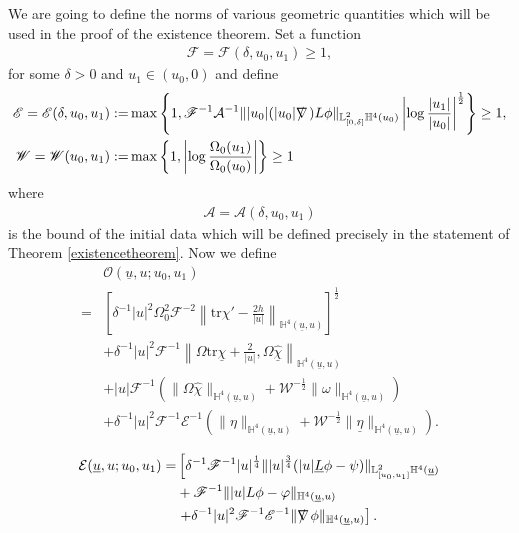 \documentclass[11pt,reqno]{amsart}
\theoremstyle{definition}
\numberwithin{equation}{section}
\newcommand{\tr}{\mathrm{tr}}
\renewcommand{\L}{\mathbb{L}}
\renewcommand{\H}{\mathbb{H}}
\def\chib{\underline{\chi}}
\def\chibh{\widehat{\underline{\chi}}}
\def\chih{\widehat{\chi}}
\def\etab{\underline{\eta}}
\def\Lb{\underline{L}}
\def\tr{\mathrm{tr}}
\def\ub{\underline{u}}
\newcommand{\logOmega}{\left|\log\frac{\Omega_0(u_1)}{\Omega_0(u_0)}\right|}
\def\nablas{\mbox{$\nabla \mkern -13mu /$ }}
\begin{document}
We are going to define the norms of various geometric quantities which will be used in the proof of the existence theorem. Set a function
\begin{align*}
\mathscr{F}=\mathscr{F}(\delta,u_0,u_1)\ge1,
\end{align*}
for some $\delta>0$ and $u_1\in(u_0,0)$ and define
\begin{align*}
\mathscr{E}=\mathscr{E}(\delta,u_0,u_1):=&\max\left\{1, \mathscr{F}^{-1}\mathcal{A}^{-1}\||u_0|(|u_0|\nablas)L\phi\|_{\L^2_{[0,\delta]}\H^4(u_0)}\left|\log\frac{|u_1|}{|u_0|}\right|^{\frac{1}{2}}\right\}\ge1,\\
\mathscr{W}=\mathscr{W}(u_0,u_1):=&\max\left\{1,\logOmega\right\}\ge1
\end{align*}
where
\begin{align*}
\mathcal{A}=\mathcal{A}(\delta,u_0,u_1)
\end{align*}
is the bound of the initial data which will be defined precisely in the statement of Theorem \ref{existencetheorem}. Now we define
    \begin{align*}
    &\mathcal{O}(\ub,u;u_0,u_1)\\
    =&\left[\delta^{-1}|u|^2\Omega_0^2\mathscr{F}^{-2}\left\|\tr\chi'-\frac{2h}{|u|}\right\|_{\H^4(\ub,u)}\right]^{\frac{1}{2}}\\
    &+\delta^{-1}|u|^2\mathscr{F}^{-1}\left\|\Omega\tr\chib+\frac{2}{|u|},\Omega\chibh\right\|_{\H^4(\ub,u)}\\
        &+|u|\mathscr{F}^{-1}\left(\|\Omega\chih\|_{\H^4(\ub,u)}+\mathscr{W}^{-\frac{1}{2}}\|\omega\|_{\H^4(\ub,u)}\right)\\&+\delta^{-1}|u|^2\mathscr{F}^{-1}\mathscr{E}^{-1}\left(\|\eta\|_{\H^4(\ub,u)}+\mathscr{W}^{-\frac{1}{2}}\|\etab\|_{\H^4(\ub,u)}\right).
    \end{align*}

    \begin{align*}
    \mathcal{E}(\ub,u;u_0,u_1)=
     &\left[\delta^{-1}\mathscr{F}^{-1}|u|^{\frac{1}{4}}\||u|^{\frac{3}{4}}(|u|\Lb\phi-\psi)\|_{\L_{[u_0,u_1]}^2\H^4(\ub)}\right.\\
        &+\mathscr{F}^{-1}\||u|L\phi-\varphi\|_{\H^4(\ub,u)}\\&\left.+\delta^{-1}|u|^2\mathscr{F}^{-1}\mathscr{E}^{-1}\|\nablas\phi\|_{\H^4(\ub,u)}\right].
    \end{align*}
    
\end{document}

